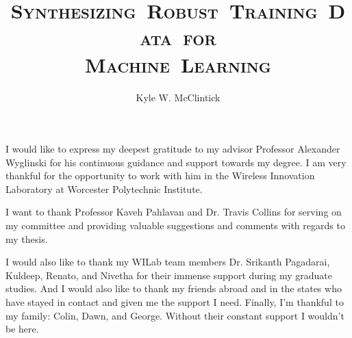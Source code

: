 \documentclass[11pt]{mvlthesis}
\title{\scshape \mbox{Synthesizing Robust Training Data for}\\
\scshape \mbox{Machine Learning}}
\author{Kyle W. McClintick}
\begin{document}
\maketitle
\begin{abstract}



\end{abstract}

\begin{frontmatter}
\begin{acknowledgements}
\begin{center}
\vspace{0.4in}
I would like to express my deepest gratitude to my advisor Professor Alexander Wyglinski for his continuous guidance and support towards my degree. I am very thankful for the opportunity to work with him in the Wireless Innovation Laboratory at Worcester Polytechnic Institute. 

I want to thank Professor Kaveh Pahlavan and Dr. Travis Collins for serving on my committee and providing valuable suggestions and comments with regards to my thesis. 

I would also like to thank my WILab team members Dr. Srikanth Pagadarai, Kuldeep, Renato, and Nivetha for their immense support during my graduate studies. And I would also like to thank my friends abroad and in the states who have stayed in contact and given me the support I need. Finally, I'm thankful to my family: Colin, Dawn, and George. Without their constant support I wouldn't be here.

\end{center}
\end{acknowledgements}

\tableofcontents
\listoffigures
\listoftables

\end{frontmatter}



%















\appendix


\end{document}
